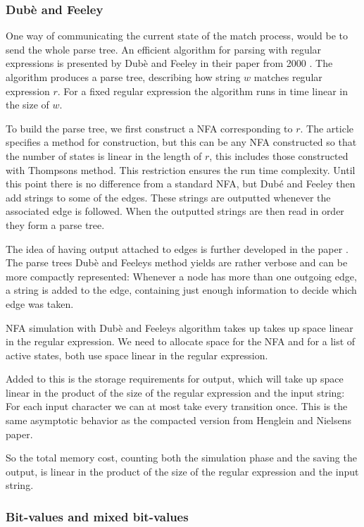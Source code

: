 \subsubsection{Dubè and Feeley}
One way of communicating the current state of the match process, would
be to send the whole parse tree. An efficient algorithm for parsing
with regular expressions is presented by Dubè and Feeley in their
paper from 2000 \cite{Dube2000}. The algorithm produces a parse tree,
describing how string $w$ matches regular expression $r$. For a fixed
regular expression the algorithm runs in time linear in the size of
$w$.

To build the parse tree, we first construct a NFA corresponding to
$r$. The article specifies a method for construction, but this can be
any NFA constructed so that the number of states is linear in the
length of $r$, this includes those constructed with Thompsons
method\cite{Thompson1968}. This restriction ensures the run time
complexity. Until this point there is no difference from a standard
NFA, but Dubé and Feeley then add strings to some of the edges. These
strings are outputted whenever the associated edge is followed. When
the outputted strings are then read in order they form a parse tree.

The idea of having output attached to edges is further developed in
the paper \cite{Henglein2010}. The parse trees Dubè and Feeleys method
yields are rather verbose and can be more compactly represented:
Whenever a node has more than one outgoing edge, a string is added to
the edge, containing just enough information to decide which edge was
taken.

NFA simulation with Dubè and Feeleys algorithm takes up takes up space
linear in the regular expression. We need to allocate space for the
NFA and for a list of active states, both use space linear in the
regular expression.

Added to this is the storage requirements for output, which will take
up space linear in the product of the size of the regular expression
and the input string: For each input character we can at most take
every transition once. This is the same asymptotic behavior as the
compacted version from Henglein and Nielsens paper.

So the total memory cost, counting both the simulation phase and the
saving the output, is linear in the product of the size of the regular
expression and the input string.


\subsubsection{Bit-values and mixed bit-values}


